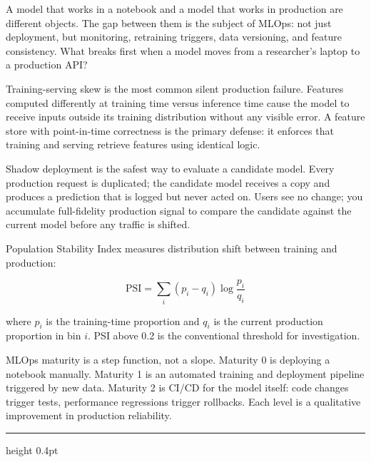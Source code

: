 \documentclass[12pt,a4paper]{article}
\begin{document}
A model that works in a notebook and a model that works in production are
different objects. The gap between them is the subject of MLOps: not just
deployment, but monitoring, retraining triggers, data versioning, and
feature consistency. What breaks first when a model moves from a
researcher's laptop to a production API?

\begin{concept}
Training-serving skew is the most common silent production failure.
Features computed differently at training time versus inference time cause
the model to receive inputs outside its training distribution without any
visible error. A feature store with point-in-time correctness is the
primary defense: it enforces that training and serving retrieve features
using identical logic.
\end{concept}

\begin{analogy}
Shadow deployment is the safest way to evaluate a candidate model.
Every production request is duplicated; the candidate model receives a
copy and produces a prediction that is logged but never acted on. Users
see no change; you accumulate full-fidelity production signal to compare
the candidate against the current model before any traffic is shifted.
\end{analogy}

Population Stability Index measures distribution shift between training
and production:

\begin{equation*}
  \mathrm{PSI}
  = \sum_i (p_i - q_i)\log\frac{p_i}{q_i}
\end{equation*}

where $p_i$ is the training-time proportion and $q_i$ is the current
production proportion in bin $i$. PSI above 0.2 is the conventional
threshold for investigation.

\begin{mentalmodel}
MLOps maturity is a step function, not a slope. Maturity 0 is deploying
a notebook manually. Maturity 1 is an automated training and deployment
pipeline triggered by new data. Maturity 2 is CI/CD for the model itself:
code changes trigger tests, performance regressions trigger rollbacks.
Each level is a qualitative improvement in production reliability.
\end{mentalmodel}

\vspace{10pt}\hrule height 0.4pt\vspace{14pt}
\end{document}
